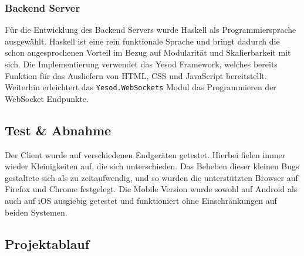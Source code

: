 \subsubsection{Backend Server}
Für die Entwicklung des Backend Servers wurde Haskell als
Programmiersprache ausgewählt. Haskell ist eine rein funktionale
Sprache und bringt dadurch die schon angesprochenen Vorteil im Bezug
auf Modularität und Skalierbarkeit mit sich. Die Implementierung
verwendet das \gls{Yesod Framework}, welches bereits Funktion für das
Ausliefern von HTML, CSS und JavaScript bereitstellt. Weiterhin erleichtert
das \texttt{Yesod.WebSockets} Modul das Programmieren der WebSocket Endpunkte.
\subsection{Test \& Abnahme}
Der Client wurde auf verschiedenen Endgeräten getestet. Hierbei fielen
immer wieder Kleinigkeiten auf, die sich unterschieden. Das Beheben
dieser kleinen Bugs gestaltete sich als zu zeitaufwendig, und so wurden
die unterstützten Browser auf Firefox und Chrome festgelegt.
Die Mobile Version wurde sowohl auf Android als auch auf iOS ausgiebig
getestet und funktioniert ohne Einschränkungen auf beiden Systemen.
\subsection{Projektablauf}

